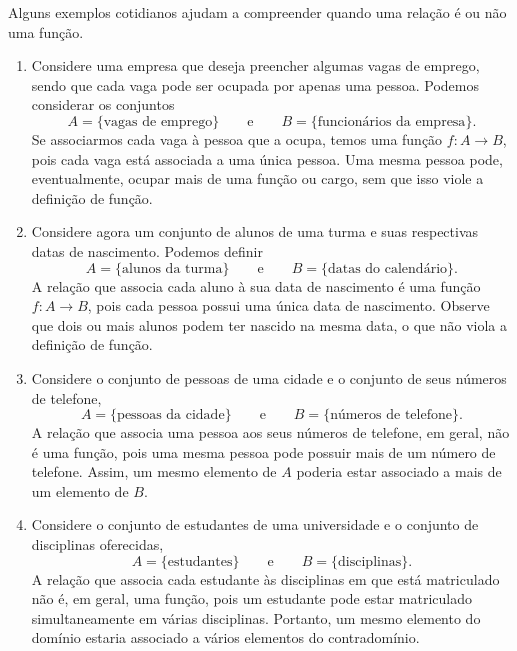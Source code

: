 \begin{example}
    Alguns exemplos cotidianos ajudam a compreender quando uma relação é ou não uma função.

    \begin{enumerate}
        \item[(i)] Considere uma empresa que deseja preencher algumas vagas de emprego, sendo que cada vaga pode ser ocupada por apenas uma pessoa. Podemos considerar os conjuntos
        \[
            A=\{\text{vagas de emprego}\}
            \qquad\text{e}\qquad
            B=\{\text{funcionários da empresa}\}.
        \]
        Se associarmos cada vaga à pessoa que a ocupa, temos uma função $f:A\to B$, pois cada vaga está associada a uma única pessoa. Uma mesma pessoa pode, eventualmente, ocupar mais de uma função ou cargo, sem que isso viole a definição de função.

        \item[(ii)] Considere agora um conjunto de alunos de uma turma e suas respectivas datas de nascimento. Podemos definir
        \[
            A=\{\text{alunos da turma}\}
            \qquad\text{e}\qquad
            B=\{\text{datas do calendário}\}.
        \]
        A relação que associa cada aluno à sua data de nascimento é uma função $f:A\to B$, pois cada pessoa possui uma única data de nascimento. Observe que dois ou mais alunos podem ter nascido na mesma data, o que não viola a definição de função.

        \item[(iii)] Considere o conjunto de pessoas de uma cidade e o conjunto de seus números de telefone,
        \[
            A=\{\text{pessoas da cidade}\}
            \qquad\text{e}\qquad
            B=\{\text{números de telefone}\}.
        \]
        A relação que associa uma pessoa aos seus números de telefone, em geral, não é uma função, pois uma mesma pessoa pode possuir mais de um número de telefone. Assim, um mesmo elemento de $A$ poderia estar associado a mais de um elemento de $B$.

        \item[(iv)] Considere o conjunto de estudantes de uma universidade e o conjunto de disciplinas oferecidas,
        \[
            A=\{\text{estudantes}\}
            \qquad\text{e}\qquad
            B=\{\text{disciplinas}\}.
        \]
        A relação que associa cada estudante às disciplinas em que está matriculado não é, em geral, uma função, pois um estudante pode estar matriculado simultaneamente em várias disciplinas. Portanto, um mesmo elemento do domínio estaria associado a vários elementos do contradomínio.
    \end{enumerate}
\end{example}


